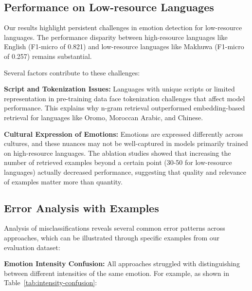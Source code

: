 \documentclass[a4paper,12pt]{extarticle}
\begin{document}
\subsection{Performance on Low-resource Languages}

Our results highlight persistent challenges in emotion detection for low-resource languages. The performance disparity between high-resource languages like English (F1-micro of 0.821) and low-resource languages like Makhuwa (F1-micro of 0.257) remains substantial.

Several factors contribute to these challenges:

\textbf{Script and Tokenization Issues:} Languages with unique scripts or limited representation in pre-training data face tokenization challenges that affect model performance. This explains why n-gram retrieval outperformed embedding-based retrieval for languages like Oromo, Moroccan Arabic, and Chinese.

\textbf{Cultural Expression of Emotions:} Emotions are expressed differently across cultures, and these nuances may not be well-captured in models primarily trained on high-resource languages. The ablation studies showed that increasing the number of retrieved examples beyond a certain point (30-50 for low-resource languages) actually decreased performance, suggesting that quality and relevance of examples matter more than quantity.

\subsection{Error Analysis with Examples}

Analysis of misclassifications reveals several common error patterns across approaches, which can be illustrated through specific examples from our evaluation dataset:

\textbf{Emotion Intensity Confusion:} All approaches struggled with distinguishing between different intensities of the same emotion. For example, as shown in Table~\ref{tab:intensity-confusion}:
\end{document}
